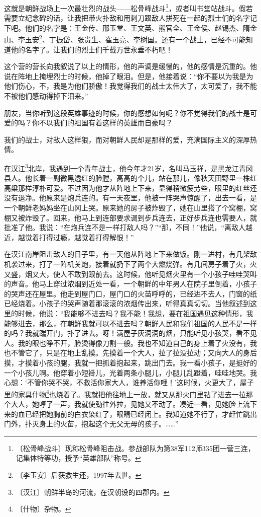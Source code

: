 \documentclass[12pt,UTF-8,openany]{ctexbook}
\begin{document}
\begin{normalsize}
    这就是朝鲜战场上一次最壮烈的战头——松骨峰战斗\footnote{〔松骨峰战斗〕现称松骨峰阻击战。参战部队为第38军112师335团一营三连，记集体特等功，授予“英雄部队”称号。}，或者叫书堂站战斗。假若需要立纪念碑的话，让我把带火扑敌和用刺刀跟敌人拼死在一起的烈士们的名字记下吧。他们的名字是：王金传、邢玉堂、王文英、熊官全、王金侯、赵锡杰、隋金山、李玉安\footnote{〔李玉安〕后获救生还，1997年去世。}、丁振岱、张贵生、崔玉亮、李树国。还有一个战士，已经不可能知道他的名字了。让我们的烈士们千载万世永垂不朽吧！
    
    这个营的营长向我叙说了以上的情形，他的声调是缓慢的，他的感情是沉重的。他说在阵地上掩埋烈士的时候，他掉了眼泪。但是，他接着说：“你不要以为我是为他们伤心，不，我是为他们骄傲！我觉得我们的战士太伟大了，太可爱了，我不能不被他们感动得掉下泪来。”
    
    朋友，当你听到这段英雄事迹的时候，你的感想如何呢？你不觉得我们的战士是可爱的吗？你不以我们的祖国有着这样的英雄而自豪吗？
    
    我们的战士，对敌人这样狠，而对朝鲜人民却是那样的爱，充满国际主义的深厚热情。
    
    在汉江\footnote{〔汉江〕朝鲜半岛的河流，在汉朝设的四郡内。}北岸，我遇到一个青年战士，他今年才21岁，名叫马玉祥，是黑龙江青冈县人。他长着一副微黑透红的脸膛，高高的个儿，站在那儿，像秋天田野里一株红高粱那样淳朴可爱。不过因为他才从阵地上下来，显得稍微疲劳些，眼里的红丝还没有退净。他原来是炮兵连的。有一天夜里，他被一阵哭声惊醒了，出去一看，是一个朝鲜老妈妈坐在山冈上哭。原来她的房子被炸毁了，她在山里搭了个窝棚，窝棚又被炸毁了。回来，他马上到连部要求调到步兵连去，正好步兵连也需要人，就批准了他。我说：“在炮兵连不是一样打敌人吗？”“那，不同！”他说，“离敌人越近，越觉着打得过瘾，越觉着打得解恨！”
    
    在汉江南岸阻击敌人的日子里，有一天他从阵地上下来做饭。刚一进村，有几架敌机袭过来，打了一阵机关炮，接着就扔下了两个大燃烧弹。有几间房子着了火，火又盛，烟又大，使人不敢到跟前去。这时候，他听见烟火里有一个小孩子哇哇哭叫的声音。他马上穿过浓烟到近处一看，一个朝鲜的中年男人在院子里倒着，小孩子的哭声还在屋里。他走到屋门口，屋门口的火苗呼呼的，已经进不去人，门窗的纸已经烧着。小孩子的哭声随着那滚滚的浓烟传出来，听得真真切切。当他叙述到这里的时候，他说：“我能够不进去吗？我不能！我想，要在祖国遇见这种情形，我能够进去，那么，在朝鲜我就可以不进去吗？朝鲜人民和我们祖国的人民不是一样的吗？我就踹开门，扑了进去。呀！满屋子灰洞洞的烟，只能听见小孩哭，看不见人。我的眼也睁不开，脸烫得像刀割一般。我也不知道自己的身上着了火没有，我也不管它了，只是在地上乱摸。先摸着一个大人，拉了拉没拉动；又向大人的身后摸，才摸着小孩的腿，我就一把抓着抱起来，跳出门去。我一看小孩子，是挺好的一个小孩儿啊。他穿着小短褂儿，光着两条小腿儿，小腿儿乱蹬着，哇哇地哭。我心想：‘不管你哭不哭，不救活你家大人，谁养活你哩！’这时候，火更大了，屋子里的家具什物\footnote{〔什物〕杂物。}也烧着了。我就把他往地上一放，就又从那火门里钻了进去一拉那个大人，她哼了一声，我就使劲往外拉，见她又不动了。凑近一看，见她脸上流下来的血已经把她胸前的白衣染红了，眼睛已经闭上。我知道她不行了，才赶忙跳出门外，扑灭身上的火苗，抱起这个无父无母的孩子。……”
    

\end{normalsize}
\end{document}
